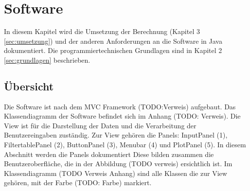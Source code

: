 
\section{Software} \label{sec:software}
In diesem Kapitel wird die Umsetzung der Berechnung (Kapitel 3 \ref{sec:umsetzung}) und der anderen Anforderungen an die Software in Java dokumentiert. Die programmiertechnischen Grundlagen sind in Kapitel 2 \ref{sec:grundlagen} beschrieben.


\subsection{Übersicht} \label{subsec:uebersicht}

Die Software ist nach dem MVC Framework (TODO:Verweis) aufgebaut. Das Klassendiagramm der Software befindet sich im Anhang (TODO: Verweis). Die View ist für die Darstellung der Daten und die Verarbeitung der Benutzereingaben zuständig. Zur View gehören die Panels: InputPanel (1), FiltertablePanel (2), ButtonPanel (3), Menubar (4) und PlotPanel (5). In diesem Abschnitt werden die Panels dokumentiert Diese bilden zusammen die Benutzeroberfläche, die in der Abbildung (TODO verweis) ersichtlich ist. Im Klassendiagramm (TODO Verweis Anhang) sind alle Klassen die zur View gehören, mit der Farbe (TODO: Farbe) markiert.












